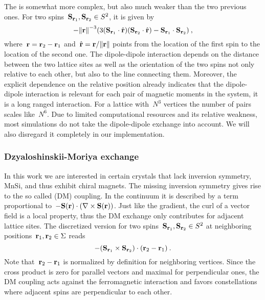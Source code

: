 The  is somewhat more complex, but also much
weaker than the two previous ones. For two spins~$\mathbf{S}_{\mathbf{r}_1}, \mathbf{S}_{\mathbf{r}_2} \in S^2$,
it is given by
%
\begin{equation}
  - {\norm{\r}^{-3}} (3 (\S_{\r_1} \cdot \hat{\r})
  (\S_{\r_2} \cdot \hat{\r}) - \S_{\r_1} \cdot \S_{\r_2})\:,
\end{equation}
%
where~$\mathbf{r} = \mathbf{r}_2 - \mathbf{r}_1$ and~$\hat{\r} = \r / \norm{\r}$ points from the
location of the first spin to the location of the second one. The dipole-dipole
interaction depends on the distance between the two lattice sites as well as the
orientation of the two spins not only relative to each other, but also to the
line connecting them. Moreover, the explicit dependence on the relative position
already indicates that the dipole-dipole interaction is relevant for each pair
of magnetic moments in the system, it is a long ranged interaction. For a
lattice with~$N^3$ vertices the number of pairs scales like~$N^6$. Due to
limited computational resources and its relative weakness, most simulations do
not take the dipole-dipole exchange into account. We will also disregard it
completely in our implementation.

\subsubsection{Dzyaloshinskii-Moriya exchange}

In this work we are interested in certain crystals that lack inversion symmetry,
\eg{} MnSi, and thus exhibit chiral magnets. The missing inversion symmetry
gives rise to the so called  (DM) coupling.
In the continuum it is described by a term proportional to~$-\mathbf{S}(\mathbf{r}) \cdot
(\nabla \times \mathbf{S}(\mathbf{r}))$. Just like the gradient, the curl of a vector field is a
local property, thus the DM exchange only contributes for adjacent lattice
sites. The discretized version for two spins~$\mathbf{S}_{\mathbf{r}_1}, \mathbf{S}_{\mathbf{r}_2} \in S^2$ at
neighboring positions~$\mathbf{r}_1, \mathbf{r}_2 \in \Sigma$ reads
\begin{equation}
  - (\mathbf{S}_{\mathbf{r}_1} \times \mathbf{S}_{\mathbf{r}_2}) \cdot (\mathbf{r}_2 - \mathbf{r}_1)\:.
\end{equation}
%
Note that~$\mathbf{r}_2 - \mathbf{r}_1$ is normalized by definition for neighboring vertices.
Since the cross product is zero for parallel vectors and maximal for
perpendicular ones, the DM coupling acts against the ferromagnetic interaction
and favors constellations where adjacent spins are perpendicular to each other.

